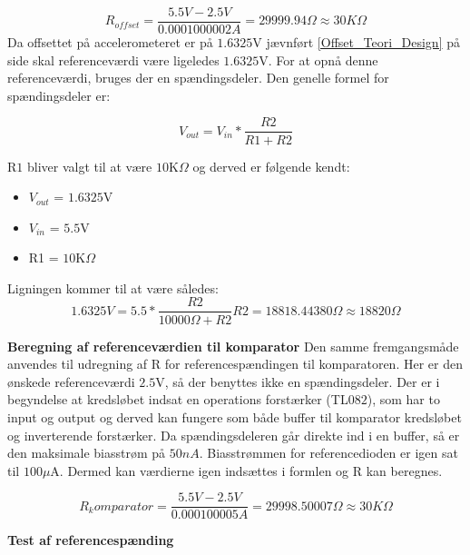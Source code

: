 \begin{equation}
R_{offset}=\frac{5.5V-2.5V}{0.0001000002A}=29999.94\Omega \approx 30K\Omega
\end{equation}  
Da offsettet på accelerometeret er på $1.6325$V jævnført \ref{Offset_Teori_Design} på side \pageref{Offset_Teori_Design} skal referenceværdi være ligeledes $1.6325$V. For at opnå denne referenceværdi, bruges der en spændingsdeler. Den genelle formel for spændingsdeler er: 

\begin{equation} \label{Spaendingsdeler}
V_{out}=V_{in}*\dfrac{R2}{R1+R2}
\end{equation}

R$1$ bliver valgt til at være $10$K$\Omega$ og derved er følgende kendt: 
\begin{itemize}
\item $V_{out}$  = $1.6325$V
\item $V_{in}$ = $5.5$V
\item R1 = $10$K$\Omega$
\end{itemize}
Ligningen kommer til at være således: 
\begin{equation}
1.6325V = 5.5* \dfrac{R2}{10000\Omega+R2} 
R2 = 18818.44380\Omega \approx 18820\Omega
\end{equation}

\noindent \textbf{Beregning af referenceværdien til komparator}
Den samme fremgangsmåde anvendes til udregning af R for referencespændingen til komparatoren. Her er den ønskede referenceværdi  $2.5$V, så der benyttes ikke en spændingsdeler. Der er i begyndelse at kredsløbet indsat en operations forstærker (TL$082$), som har to input og output og derved kan fungere som både buffer til komparator kredsløbet og inverterende forstærker. Da spændingsdeleren går direkte ind i en buffer, så er den maksimale biasstrøm på $50nA$. Biasstrømmen for referencedioden er igen sat til $100\mu$A. Dermed kan værdierne igen indsættes i formlen og R kan beregnes.

\begin{equation}
R_komparator=\frac{5.5V-2.5V}{0.000100005A}=29998.50007\Omega \approx 30K\Omega 
\end{equation} 

\textbf{Test af referencespænding}

 